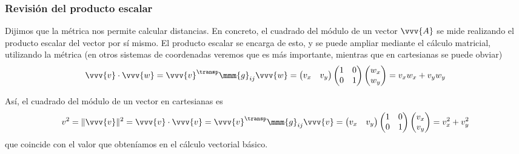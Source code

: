 \subsubsection{Revisión del producto escalar}
Dijimos que la métrica nos permite calcular distancias. En concreto, el cuadrado del
módulo de un vector $\vvv{A}$ se mide realizando el producto escalar del vector por sí
mismo.
El producto escalar se encarga de esto, y se puede ampliar mediante el cálculo
matricial, utilizando la métrica (en otros sistemas de coordenadas veremos que es más
importante, mientras que en cartesianas se puede obviar)
\[
  \vvv{v}\cdot\vvv{w}
  =
  \vvv{v}^\transp \mmm{g}_{ij} \vvv{w}
  =
  \begin{pmatrix}
    v_x &  v_y
  \end{pmatrix}
  \begin{pmatrix}
    1 & 0\\
    0 & 1
  \end{pmatrix}
  \begin{pmatrix}
    w_x\\
    w_y
  \end{pmatrix}
  =
  v_xw_x + v_y w_y
\]
  
Así, el cuadrado del módulo de un vector en cartesianas es
\[
  v^2
  =
  \|\vvv{v}\|^2
  =
  \vvv{v}\cdot\vvv{v}
  =
  \vvv{v}^\transp \mmm{g}_{ij} \vvv{v}
  =
  \begin{pmatrix}
  v_x &  v_y
\end{pmatrix}
\begin{pmatrix}
  1 & 0\\
  0 & 1
\end{pmatrix}
\begin{pmatrix}
  v_x\\
  v_y
\end{pmatrix}
=
v_x^2 + v_y^2
\]
que coincide con el valor que obteníamos en el cálculo vectorial básico.

